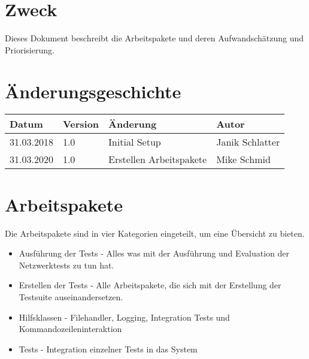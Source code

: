 \documentclass[
	ngerman,
	toc=listof, %
	toc=bibliography, %
	footnotes=multiple, %
	parskip=half, %
	numbers=noendperiod %
]{scrartcl}
\newcommand{\vorlagenOrdner}{../../99_Vorlagen} %
\begin{document}
\thispagestyle{plain}

\cleardoublepage


\section*{Zweck}
Dieses Dokument beschreibt die Arbeitspakete und deren Aufwandschätzung und Priorisierung.

\section*{Änderungsgeschichte}
\begin{tabularx}{\textwidth}{llXl}
	\toprule
	Datum & Version & Änderung & Autor \\
	\midrule
	31.03.2018 & 1.0 & Initial Setup & Janik Schlatter \\
	31.03.2020 & 1.0 & Erstellen Arbeitspakete & Mike Schmid \\
	\bottomrule
\end{tabularx}
\cleardoublepage

{}
\tableofcontents
\cleardoublepage

\let\stdsection\section
\renewcommand\section{\clearpage\stdsection}

\section{Arbeitspakete}
Die Arbeitspakete sind in vier Kategorien eingeteilt, um eine Übersicht zu bieten. 
\begin{itemize}
	\item Ausführung der Tests - Alles was mit der Ausführung und Evaluation der Netzwerktests zu tun hat.
	\item Erstellen der Tests - Alle Arbeitspakete, die sich mit der Erstellung der Testsuite auseinandersetzen.
	\item Hilfsklassen - Filehandler, Logging, Integration Tests und Kommandozeileninteraktion
	\item Tests - Integration einzelner Tests in das System

\end{itemize}
\end{document}
